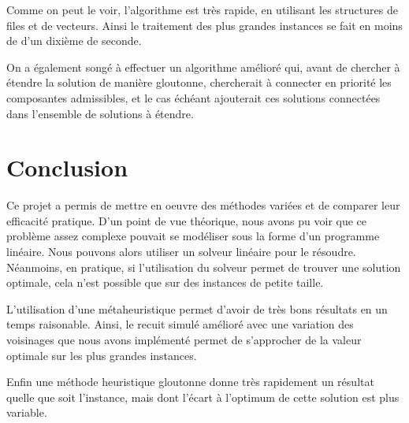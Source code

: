 \documentclass[12pt,a4paper]{article}
\begin{document}
Comme on peut le voir, l'algorithme est très rapide, en utilisant les structures de files et de vecteurs. Ainsi le traitement des plus grandes instances se fait en moins de d'un dixième de seconde.

\vspace{0.5cm}


On a également songé à effectuer un algorithme amélioré qui, avant de chercher à étendre la solution de manière gloutonne, chercherait à connecter en priorité les composantes admissibles, et le cas échéant ajouterait ces solutions connectées dans l'ensemble de solutions à étendre.

\vspace{0.5cm}

\section*{Conclusion}

	Ce projet a permis de mettre en oeuvre des méthodes variées et de comparer leur efficacité pratique. D'un point de vue théorique, nous avons pu voir que ce problème assez  complexe pouvait se modéliser sous la forme d'un programme linéaire. Nous pouvons alors utiliser un solveur linéaire pour le résoudre. Néanmoins, en pratique, si l'utilisation du solveur permet de trouver une solution optimale, cela n'est possible que sur des instances de petite taille. 
	
	L'utilisation d'une métaheuristique permet d'avoir de très bons résultats en un temps raisonable. Ainsi, le recuit simulé amélioré avec une variation des voisinages que nous avons implémenté permet de s'approcher de la valeur optimale sur les plus grandes instances.
	
	Enfin une méthode heuristique gloutonne donne très rapidement un résultat quelle que 
soit l'instance, mais dont l'écart à l'optimum de cette solution est plus variable.
\end{document}

